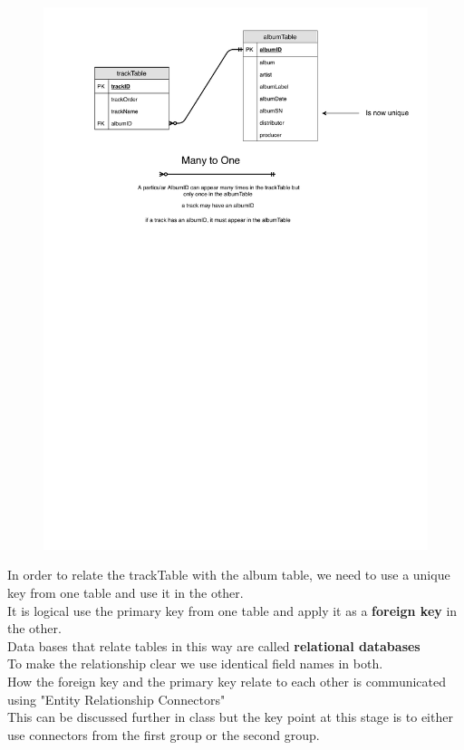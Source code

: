 \documentclass[a4paper,12pt]{article}
\begin{document}
\begin{figure}[!h]
	\centering
	\includegraphics[width=15.5cm]{DataBaseDiagrams-MusicTable_2Tables_2020.pdf}
\end{figure}

In order to relate the trackTable with the album table, we need to use a unique key from one table and use it in the other.\\
It is logical use the primary key from one table and apply it as a \textbf{foreign key} in the other.\\
Data bases that relate tables in this way are called \textbf{relational databases}\\
To make the relationship clear we use identical field names in both.\\
How the foreign key and the primary key relate to each other is communicated using "Entity Relationship Connectors"\\
This can be discussed further in class but the key point at this stage is to either use connectors from the first group or the second group.\\
\end{document}
